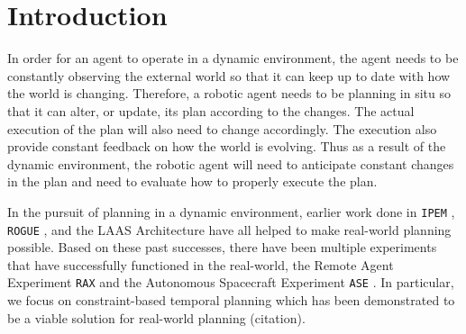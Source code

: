 \section{Introduction}
\label{sec:intro}

In order for an agent to operate in a dynamic environment, the agent
needs to be constantly observing the external world so that it can
keep up to date with how the world is changing. Therefore, a robotic
agent needs to be planning in situ so that it can alter, or update,
its plan according to the changes. The actual execution of the plan
will also need to change accordingly. The execution also provide
constant feedback on how the world is evolving. Thus as a result of
the dynamic environment, the robotic agent will need to anticipate
constant changes in the plan and need to evaluate how to properly
execute the plan.

In the pursuit of planning in a dynamic environment, earlier work done
in \texttt{IPEM} \cite{AmbrosIngerson88}, \texttt{ROGUE}
\cite{Haigh98}, and the LAAS Architecture \cite{alami:1998p820} have
all helped to make real-world planning possible. Based on these past
successes, there have been multiple experiments that have successfully
functioned in the real-world, the Remote Agent Experiment \texttt{RAX}
\cite{mus98} and the Autonomous Spacecraft Experiment \texttt{ASE}
\cite{chien99}. In particular, we focus on constraint-based temporal
planning which has been demonstrated to be a viable solution for
real-world planning (citation).
	
